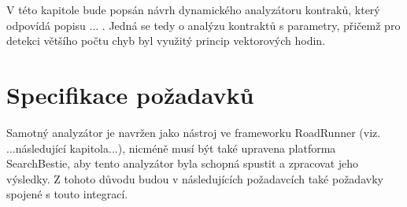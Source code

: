 V této kapitole bude popsán návrh dynamického analyzátoru kontraků, který odpovídá popisu ... . Jedná se tedy o analýzu kontraktů s parametry, přičemž pro detekci většího počtu chyb byl využitý princip vektorových hodin.

\section{Specifikace požadavků}\label{spec}

Samotný analyzátor je navržen jako nástroj ve frameworku RoadRunner (viz. ...následující kapitola...), nicméně musí být také upravena platforma SearchBestie, aby tento analyzátor byla schopná spustit a zpracovat jeho výsledky. Z tohoto důvodu budou v následujících požadavcích také požadavky spojené s touto integrací.

